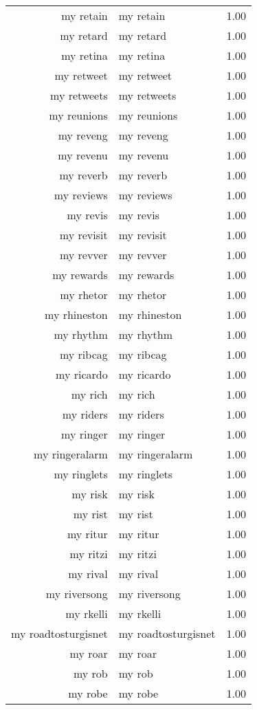 \begin{table}[ht]
\begin{tabular}{rlr}
  my retain & my retain & 1.00 \\ 
  my retard & my retard & 1.00 \\ 
  my retina & my retina & 1.00 \\ 
  my retweet & my retweet & 1.00 \\ 
  my retweets & my retweets & 1.00 \\ 
  my reunions & my reunions & 1.00 \\ 
  my reveng & my reveng & 1.00 \\ 
  my revenu & my revenu & 1.00 \\ 
  my reverb & my reverb & 1.00 \\ 
  my reviews & my reviews & 1.00 \\ 
  my revis & my revis & 1.00 \\ 
  my revisit & my revisit & 1.00 \\ 
  my revver & my revver & 1.00 \\ 
  my rewards & my rewards & 1.00 \\ 
  my rhetor & my rhetor & 1.00 \\ 
  my rhineston & my rhineston & 1.00 \\ 
  my rhythm & my rhythm & 1.00 \\ 
  my ribcag & my ribcag & 1.00 \\ 
  my ricardo & my ricardo & 1.00 \\ 
  my rich & my rich & 1.00 \\ 
  my riders & my riders & 1.00 \\ 
  my ringer & my ringer & 1.00 \\ 
  my ringeralarm & my ringeralarm & 1.00 \\ 
  my ringlets & my ringlets & 1.00 \\ 
  my risk & my risk & 1.00 \\ 
  my rist & my rist & 1.00 \\ 
  my ritur & my ritur & 1.00 \\ 
  my ritzi & my ritzi & 1.00 \\ 
  my rival & my rival & 1.00 \\ 
  my riversong & my riversong & 1.00 \\ 
  my rkelli & my rkelli & 1.00 \\ 
  my roadtosturgisnet & my roadtosturgisnet & 1.00 \\ 
  my roar & my roar & 1.00 \\ 
  my rob & my rob & 1.00 \\ 
  my robe & my robe & 1.00 \\ 

\end{tabular}
\end{table}
